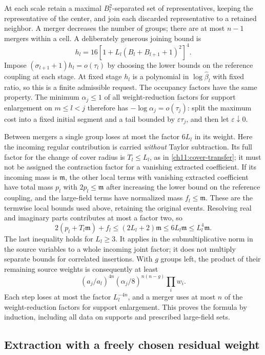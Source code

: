 At each scale retain a maximal $B_l^2$-separated set of representatives,
keeping the representative of the center, and join each discarded
representative to a retained neighbor. A merger decreases the number
of groups; there are at most $n-1$ mergers within a cell.
A deliberately generous joining bound is
\[
 h_l=16[1+L_l(B_l+B_{l+1}+1)^2]^4.
\]
Impose $(\sigma_{l+1}+1)h_l=o(\tau_l)$ by choosing the lower bounds on the reference coupling at each stage.
At fixed stage $h_l$ is a polynomial in $\log\widehat\beta_l$
with fixed ratio, so this is a finite admissible request.
The occupancy factors have the same property. The minimum
$\alpha_j\le1$ of all weight-reduction factors for support enlargement on $m\le l<j$
therefore has $-\log\alpha_j=o(\tau_j)$: split the maximum
cost into a fixed initial segment and a tail bounded by
$\varepsilon\tau_j$, and then let $\varepsilon\downarrow0$.

Between mergers a single group loses at most the factor $6L_l$ in
its weight. Here the incoming regular contribution is carried
\emph{without} Taylor subtraction. Its full factor for the change of cover radius
is $T_l\le L_l$, as in \eqref{ch11:cover-transfer}; it
must not be assigned the contraction factor for a vanishing extracted coefficient.
If its incoming mass is $\mathfrak m$, the other local terms with vanishing extracted coefficient have total mass $p_l$ with $2p_l\le\mathfrak m$
after increasing the lower bound on the reference coupling, and the large-field terms have normalized mass
$f_l\le\mathfrak m$. These are the termwise local bounds used
above, retaining the original events. Resolving real and imaginary
parts contributes at most a factor two, so
\[
 2(p_l+T_l\mathfrak m)+f_l
             \le(2L_l+2)\mathfrak m\le6L_l\mathfrak m
             \le L_l^4\mathfrak m.
\]
The last inequality holds for $L_l\ge3$. It applies in the
submultiplicative norm in the source variables to a whole incoming joint factor;
it does not multiply separate bounds for correlated insertions.
With $g$ groups left, the product of their remaining source weights is consequently
at least
\begin{equation}
 (a_j/a_l)^{4n}(\alpha_j/8)^{n(n-g)}\prod_iw_i.
 \label{ch18:group-weight}
\end{equation}
Each step loses at most the factor $L_l^{-4n}$, and a merger uses at most
$n$ of the weight-reduction factors for support enlargement. This proves the formula by
induction, including all data on supports and prescribed large-field sets.

\subsection{Extraction with a freely chosen residual weight}

